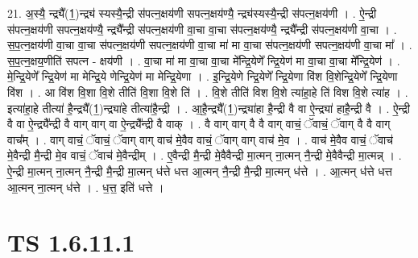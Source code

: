 \documentclass[17pt]{extarticle}
\begin{document}
21. अ॒स्यै॒ न्द्र्यै᳚(1॒)न्द्र्य॑ स्यस्यै॒न्द्री स॑पत्न॒क्षय॑णी सपत्न॒क्षय॑ण्यै॒ न्द्र्य॑स्यस्यै॒न्द्री स॑पत्न॒क्षय॑णी । . ऐ॒न्द्री स॑पत्न॒क्षय॑णी सपत्न॒क्षय॑ण्यै॒ न्द्र्यै᳚न्द्री स॑पत्न॒क्षय॑णी वा॒चा वा॒चा स॑पत्न॒क्षय॑ण्यै॒ न्द्र्यै᳚न्द्री स॑पत्न॒क्षय॑णी वा॒चा । . स॒प॒त्न॒क्षय॑णी वा॒चा वा॒चा स॑पत्न॒क्षय॑णी सपत्न॒क्षय॑णी वा॒चा मा॑ मा वा॒चा स॑पत्न॒क्षय॑णी सपत्न॒क्षय॑णी वा॒चा मा᳚ । . स॒प॒त्न॒क्षय॒णीति॑ सपत्न - क्षय॑णी । . वा॒चा मा॑ मा वा॒चा वा॒चा मे᳚न्द्रि॒येणे᳚ न्द्रि॒येण॑ मा वा॒चा वा॒चा मे᳚न्द्रि॒येण॑ । . मे॒न्द्रि॒येणे᳚ न्द्रि॒येण॑ मा मेन्द्रि॒ये णेन्द्रि॒येण॑ मा मेन्द्रि॒येणा । . इ॒न्द्रि॒येणे न्द्रि॒येणे᳚ न्द्रि॒येणा वि॑श वि॒शेन्द्रि॒येणे᳚ न्द्रि॒येणा वि॑श । . आ वि॑श वि॒शा वि॒शे तीति॑ वि॒शा वि॒शे ति॑ । . वि॒शे तीति॑ विश वि॒शे त्या॑हा॒हे ति॑ विश वि॒शे त्या॑ह । . इत्या॑हा॒हे तीत्या॑ है॒न्द्र्यै᳚(1॒)न्द्र्या॑हे तीत्या॑है॒न्द्री । . आ॒है॒न्द्र्यै᳚(1॒)न्द्र्या॑हा है॒न्द्री वै वा ऐ॒न्द्र्या॑ हाहै॒न्द्री वै । . ऐ॒न्द्री वै वा ऐ॒न्द्र्यै᳚न्द्री वै वाग् वाग् वा ऐ॒न्द्र्यै᳚न्द्री वै वाक् । . वै वाग् वाग् वै वै वाग् वाचं॒ ॅवाचं॒ ॅवाग् वै वै वाग् वाच᳚म् । . वाग् वाचं॒ ॅवाचं॒ ॅवाग् वाग् वाच॑ मे॒वैव वाचं॒ ॅवाग् वाग् वाच॑ मे॒व । . वाच॑ मे॒वैव वाचं॒ ॅवाच॑ मे॒वैन्द्री मै॒न्द्री मे॒व वाचं॒ ॅवाच॑ मे॒वैन्द्रीम् । . ए॒वैन्द्री मै॒न्द्री मे॒वैवैन्द्री मा॒त्मन् ना॒त्मन् नै॒न्द्री मे॒वैवैन्द्री मा॒त्मन्न् । . ऐ॒न्द्री मा॒त्मन् ना॒त्मन् नै॒न्द्री मै॒न्द्री मा॒त्मन् ध॑त्ते धत्त आ॒त्मन् नै॒न्द्री मै॒न्द्री मा॒त्मन् ध॑त्ते । . आ॒त्मन् ध॑त्ते धत्त आ॒त्मन् ना॒त्मन् ध॑त्ते । . ध॒त्त॒ इति॑ धत्ते । \newline
\pagebreak
{}

\section{ TS 1.6.11.1 }
\end{document}
